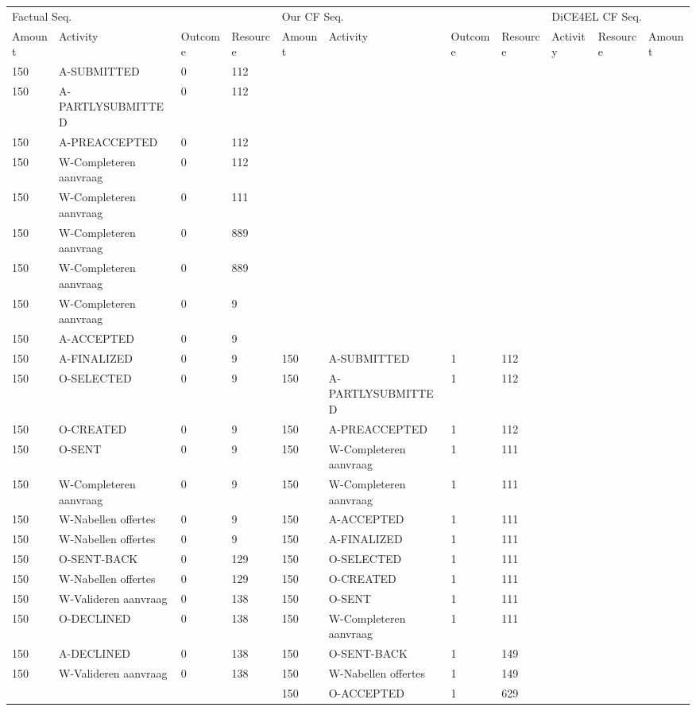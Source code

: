 \begin{tabular}{lllllllllll}
\toprule
\multicolumn{4}{l}{Factual Seq.} & \multicolumn{4}{l}{Our CF Seq.} & \multicolumn{3}{l}{DiCE4EL CF Seq.} \\
Amount & Activity & Outcome & Resource & Amount & Activity & Outcome & Resource & Activity & Resource & Amount \\
\midrule
150 & A-SUBMITTED & 0 & 112 &  &  &  &  &  &  &  \\
150 & A-PARTLYSUBMITTED & 0 & 112 &  &  &  &  &  &  &  \\
150 & A-PREACCEPTED & 0 & 112 &  &  &  &  &  &  &  \\
150 & W-Completeren aanvraag & 0 & 112 &  &  &  &  &  &  &  \\
150 & W-Completeren aanvraag & 0 & 111 &  &  &  &  &  &  &  \\
150 & W-Completeren aanvraag & 0 & 889 &  &  &  &  &  &  &  \\
150 & W-Completeren aanvraag & 0 & 889 &  &  &  &  &  &  &  \\
150 & W-Completeren aanvraag & 0 & 9 &  &  &  &  &  &  &  \\
150 & A-ACCEPTED & 0 & 9 &  &  &  &  &  &  &  \\
150 & A-FINALIZED & 0 & 9 & 150 & A-SUBMITTED & 1 & 112 &  &  &  \\
150 & O-SELECTED & 0 & 9 & 150 & A-PARTLYSUBMITTED & 1 & 112 &  &  &  \\
150 & O-CREATED & 0 & 9 & 150 & A-PREACCEPTED & 1 & 112 &  &  &  \\
150 & O-SENT & 0 & 9 & 150 & W-Completeren aanvraag & 1 & 111 &  &  &  \\
150 & W-Completeren aanvraag & 0 & 9 & 150 & W-Completeren aanvraag & 1 & 111 &  &  &  \\
150 & W-Nabellen offertes & 0 & 9 & 150 & A-ACCEPTED & 1 & 111 &  &  &  \\
150 & W-Nabellen offertes & 0 & 9 & 150 & A-FINALIZED & 1 & 111 &  &  &  \\
150 & O-SENT-BACK & 0 & 129 & 150 & O-SELECTED & 1 & 111 &  &  &  \\
150 & W-Nabellen offertes & 0 & 129 & 150 & O-CREATED & 1 & 111 &  &  &  \\
150 & W-Valideren aanvraag & 0 & 138 & 150 & O-SENT & 1 & 111 &  &  &  \\
150 & O-DECLINED & 0 & 138 & 150 & W-Completeren aanvraag & 1 & 111 &  &  &  \\
150 & A-DECLINED & 0 & 138 & 150 & O-SENT-BACK & 1 & 149 &  &  &  \\
150 & W-Valideren aanvraag & 0 & 138 & 150 & W-Nabellen offertes & 1 & 149 &  &  &  \\
 &  &  &  & 150 & O-ACCEPTED & 1 & 629 &  &  &  \\
\bottomrule
\end{tabular}
